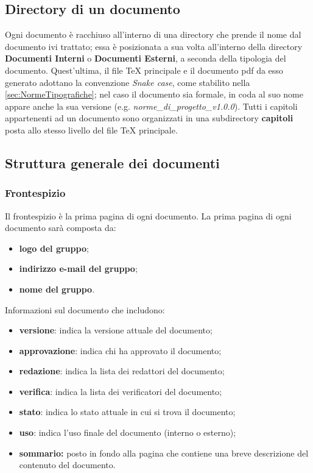 \subsection{Directory di un documento}\label{ProcessiDiSupportoDocumentazioneDirectoryDiUnDocumento}
Ogni documento è racchiuso all'interno di una directory che prende il nome dal documento ivi trattato; essa è posizionata a sua volta all'interno della directory \textbf{Documenti Interni} o \textbf{Documenti Esterni}, a seconda della tipologia del documento. Quest'ultima, il file \TeX{} principale e il documento pdf da esso generato adottano la convenzione \textit{Snake case}, come stabilito nella \autoref{sec:NormeTipografiche}; nel caso il documento sia formale, in coda al suo nome appare anche la sua versione (e.g. \textit{norme\_di\_progetto\_v1.0.0}).
Tutti i capitoli appartenenti ad un documento sono organizzati in una subdirectory \textbf{capitoli} posta allo stesso livello del file \TeX{} principale.
\subsection{Struttura generale dei documenti}\label{ProcessiDiSupportoDocumentazioneStrutturaGeneraleDeiDocumenti}
\subsubsection{Frontespizio}\label{ProcessiDiSupportoDocumentazioneStrutturaGeneraleDeiDocumentiFrontespizio}
Il frontespizio è la prima pagina di ogni documento.
La prima pagina di ogni documento sarà composta da:
\begin{itemize}
	\item \textbf{logo del gruppo};
		\item \textbf{indirizzo e-mail del gruppo};
			\item \textbf{nome del gruppo}.
\end{itemize}
Informazioni sul documento che includono:
\begin{itemize}
	\item \textbf{versione}: indica la versione attuale del documento;
		\item \textbf{approvazione}: indica chi ha approvato il documento;
			\item \textbf{redazione}: indica la lista dei redattori del documento;
				\item \textbf{verifica}: indica la lista dei verificatori del documento;
					\item \textbf{stato}: indica lo stato attuale in cui si trova il documento;
						\item \textbf{uso}: indica l’uso finale del documento (interno o esterno);
							\item \textbf{sommario:} posto in fondo alla pagina che contiene una breve descrizione del contenuto del documento.
\end{itemize}
